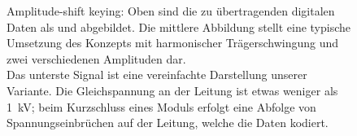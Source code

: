 \begin{figure}[h!tb]
    \centering
    
    \caption[Amplitude-shift keying]{%
        Amplitude-shift  keying: Oben   sind  die   zu  \"ubertragenden
        digitalen  Daten als   und   abgebildet. Die  mittlere
        Abbildung stellt eine typische Umsetzung des Konzepts mit harmonischer
        Tr\"agerschwingung und zwei verschiedenen Amplituden dar.\protect\\
        Das  unterste   Signal  ist  eine  vereinfachte   Darstellung  unserer
        Variante.  Die  Gleichspannung an  der Leitung  ist etwas  weniger als
        \SI{1}{\kilo\volt}; beim Kurzschluss eines Moduls erfolgt eine Abfolge
        von Spannungseinbr\"uchen auf der Leitung, welche die Daten kodiert.%
    }
    \label{fig:ask:concept}
\end{figure}
